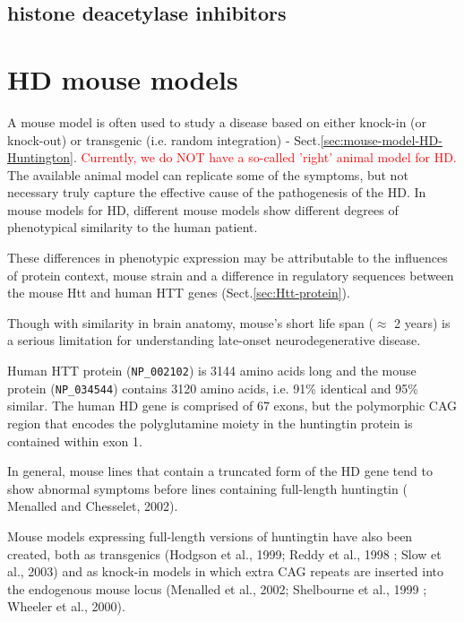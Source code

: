 \subsection{histone deacetylase inhibitors}

\section{HD mouse models}
\label{sec:HD-mouse-models}

A mouse model is often used to study a disease based on either knock-in (or
knock-out) or transgenic (i.e. random integration) - Sect.\ref{sec:mouse-model-HD-Huntington}.
\textcolor{red}{Currently, we do NOT have a so-called 'right' animal model for
HD.} The available animal model can replicate some of the symptoms, but not
necessary truly capture the effective cause of the pathogenesis of the HD.
In mouse models for HD, different mouse models show different degrees of
phenotypical similarity to the human patient.

\begin{mdframed}
These differences in phenotypic expression may be attributable to the influences
of protein context, mouse strain and a difference in regulatory sequences
between the mouse Htt and human HTT genes (Sect.\ref{sec:Htt-protein}).

Though with similarity in brain anatomy, mouse's short life span ($\approx$ 2
years) is a serious limitation for understanding late-onset neurodegenerative
disease.

\end{mdframed}

Human HTT protein (\verb!NP_002102!) is 3144 amino acids long and the mouse
protein (\verb!NP_034544!) contains 3120 amino acids, i.e. 91\% identical and
95\% similar. The human HD gene is comprised of 67 exons, but the polymorphic
CAG region that encodes the polyglutamine moiety in the huntingtin protein is
contained within exon 1.  

In general, mouse lines that contain a truncated form of the HD gene tend to
show abnormal symptoms before lines containing full-length huntingtin (
Menalled and Chesselet, 2002).

Mouse models expressing full-length versions of huntingtin have also been
created, both as transgenics (Hodgson et al., 1999; Reddy et al., 1998 ;  Slow
et al., 2003) and as knock-in models in which extra CAG repeats are inserted
into the endogenous mouse locus (Menalled et al., 2002; Shelbourne et al., 1999
; Wheeler et al., 2000).   
 
